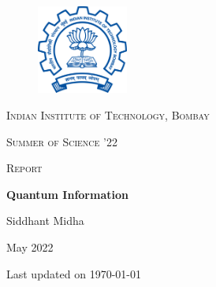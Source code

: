 \documentclass{article}
\title{}
\author{Siddhant Midha}
\date{}
\newcommand{\updateinfo}[1][\today]{\par\vfill\hfill{\scriptsize\color{gray}Last updated on #1}}
\theoremstyle{definition}
\begin{document}
\begin{titlepage}
    \centering
    \begin{figure}[htp]
        \centering
        \includegraphics[width=3cm]{logo}
         \label{fig:galaxy}
    \end{figure}
    {\scshape\LARGE Indian Institute of Technology, Bombay \par}
    \vspace{1cm}
    {\scshape\Large Summer of Science '22\par}
    \vspace{0.3cm}
    {\scshape Report\par}
    \vspace{1.2cm}
    {\huge\bfseries Quantum Information\par}
    \vspace{2cm}
    {\Large Siddhant Midha\par}

    \vfill

    {\large May 2022}
\updateinfo 
\end{titlepage}
\tableofcontents\newpage 
{}


%
\newpage 
\end{document}
